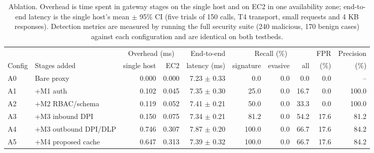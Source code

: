 \begin{table}[t]
\centering
\caption{Ablation. Overhead is time spent in gateway stages on the single host and on EC2 in one availability zone; end-to-end latency is the single host's mean $\pm$ 95\% CI (five trials of 150 calls, T4 transport, small requests and 4 KB responses). Detection metrics are measured by running the full security suite (240 malicious, 170 benign cases) against each configuration and are identical on both testbeds.}
\label{tab:ablation}
\begin{tabular}{ll r r r rrr rr}
\toprule
 & & \multicolumn{2}{c}{Overhead (ms)} & End-to-end & \multicolumn{3}{c}{Recall (\%)} & FPR & Precision \\
\cmidrule(lr){3-4}\cmidrule(lr){6-8}
Config & Stages added & single host & EC2 & latency (ms) & signature & evasive & all & (\%) & (\%) \\
\midrule
A0 & Bare proxy & 0.000 & 0.000 & 7.23 $\pm$ 0.33 & 0.0 & 0.0 & 0.0 & 0.0 & -- \\
A1 & +M1 auth & 0.102 & 0.045 & 7.35 $\pm$ 0.30 & 25.0 & 0.0 & 16.7 & 0.0 & 100.0 \\
A2 & +M2 RBAC/schema & 0.119 & 0.052 & 7.41 $\pm$ 0.21 & 50.0 & 0.0 & 33.3 & 0.0 & 100.0 \\
A3 & +M3 inbound DPI & 0.150 & 0.075 & 7.34 $\pm$ 0.21 & 81.2 & 0.0 & 54.2 & 17.6 & 81.2 \\
A4 & +M3 outbound DPI/DLP & 0.746 & 0.307 & 7.87 $\pm$ 0.20 & 100.0 & 0.0 & 66.7 & 17.6 & 84.2 \\
A5 & +M4 proposed cache & 0.647 & 0.313 & 7.39 $\pm$ 0.32 & 100.0 & 0.0 & 66.7 & 17.6 & 84.2 \\
\bottomrule
\end{tabular}
\end{table}
